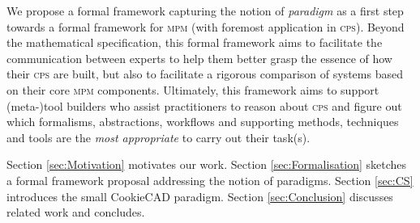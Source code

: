 We propose a formal framework capturing the notion of
\emph{paradigm} as a first step towards a formal framework for \textsc{mpm}
(with foremost application in \textsc{cps}).
Beyond the mathematical specification, this formal framework aims to facilitate
the communication between experts to help them better grasp the essence of how
their \textsc{cps} are built, but also to facilitate a rigorous comparison of
systems based on their core \textsc{mpm} components.
Ultimately, this framework aims to support (meta-)tool builders who assist
practitioners to reason about \textsc{cps} and figure out which formalisms,
abstractions, workflows and supporting methods, techniques and tools are the
\emph{most appropriate} to carry out their task(s).

Section \ref{sec:Motivation} motivates our work.
Section \ref{sec:Formalisation} sketches a 
formal framework proposal addressing the notion of paradigms.
Section \ref{sec:CS} introduces the small CookieCAD paradigm. 
Section \ref{sec:Conclusion} discusses related work and concludes.


